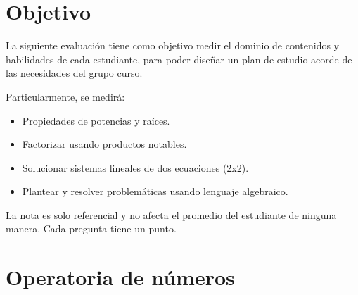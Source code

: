 \documentclass[sin curso]{srs}
\begin{document}
\section{Objetivo}

La siguiente evaluación tiene como objetivo medir el dominio de contenidos y habilidades
de cada estudiante, para poder diseñar un plan de estudio acorde de las necesidades del
grupo curso.

Particularmente, se medirá:
\begin{itemize}[nosep]
  \item Propiedades de potencias y raíces.
  \item Factorizar usando productos notables.
  \item Solucionar sistemas lineales de dos ecuaciones (2x2).
  \item Plantear y resolver problemáticas usando lenguaje algebraico.
\end{itemize}

La nota es solo referencial y no afecta el promedio del estudiante de ninguna manera. Cada
pregunta tiene un punto.

\section{Operatoria de números}
\end{document}
